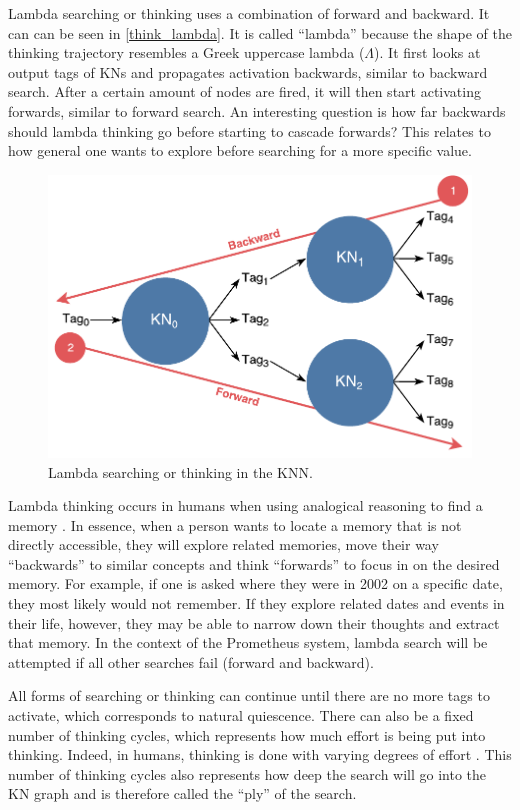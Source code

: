 \documentclass[titlepage,11pt]{article}
\begin{document}
Lambda searching or thinking uses a combination of forward and backward. It can can be seen in \autoref{think_lambda}. It is called ``lambda'' because the shape of the thinking trajectory resembles a Greek uppercase lambda ($\Lambda$). It first looks at output tags of KNs and propagates activation backwards, similar to backward search. After a certain amount of nodes are fired, it will then start activating forwards, similar to forward search. An interesting question is how far backwards should lambda thinking go before starting to cascade forwards? This relates to how general one wants to explore before searching for a more specific value.

\begin{figure}[!htb]
	\includegraphics[width=\columnwidth]{figures/lambda_search.pdf}
	\caption{Lambda searching or thinking in the KNN.}
	\label{think_lambda}
\end{figure}

Lambda thinking occurs in humans when using analogical reasoning to find a memory \cite{vybihal-lambda}. In essence, when a person wants to locate a memory that is not directly accessible, they will explore related memories, move their way ``backwards'' to similar concepts and think ``forwards'' to focus in on the desired memory. For example, if one is asked where they were in 2002 on a specific date, they most likely would not remember. If they explore related dates and events in their life, however, they may be able to narrow down their thoughts and extract that memory. In the context of the Prometheus system, lambda search will be attempted if all other searches fail (forward and backward).

All forms of searching or thinking can continue until there are no more tags to activate, which corresponds to natural quiescence. There can also be a fixed number of thinking cycles, which represents how much effort is being put into thinking. Indeed, in humans, thinking is done with varying degrees of effort \cite{thinking}. This number of thinking cycles also represents how deep the search will go into the KN graph and is therefore called the ``ply'' of the search.
\end{document}
